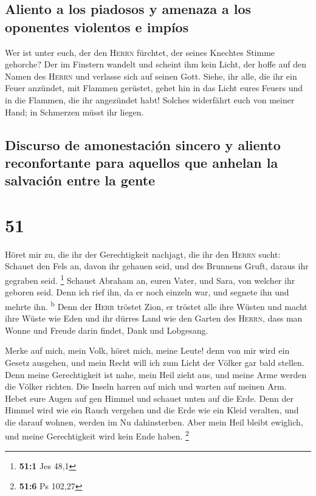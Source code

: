 \hypertarget{aliento-a-los-piadosos-y-amenaza-a-los-oponentes-violentos-e-impuxedos}{%
\subsection{Aliento a los piadosos y amenaza a los oponentes violentos e
impíos}\label{aliento-a-los-piadosos-y-amenaza-a-los-oponentes-violentos-e-impuxedos}}

 Wer ist unter euch, der den \textsc{Herrn} fürchtet, der
seines Knechtes Stimme gehorche? Der im Finstern wandelt und scheint ihm
kein Licht, der hoffe auf den Namen des \textsc{Herrn} und verlasse sich
auf seinen Gott.  Siehe, ihr alle, die ihr ein Feuer
anzündet, mit Flammen gerüstet, gehet hin in das Licht eures Feuers und
in die Flammen, die ihr angezündet habt! Solches widerfährt euch von
meiner Hand; in Schmerzen müsst ihr liegen.

\hypertarget{discurso-de-amonestaciuxf3n-sincero-y-aliento-reconfortante-para-aquellos-que-anhelan-la-salvaciuxf3n-entre-la-gente}{%
\subsection{Discurso de amonestación sincero y aliento reconfortante
para aquellos que anhelan la salvación entre la
gente}\label{discurso-de-amonestaciuxf3n-sincero-y-aliento-reconfortante-para-aquellos-que-anhelan-la-salvaciuxf3n-entre-la-gente}}

\hypertarget{section-50}{%
\section{51}\label{section-50}}

 Höret mir zu, die ihr der Gerechtigkeit nachjagt, die ihr
den \textsc{Herrn} sucht: Schauet den Fels an, davon ihr gehauen seid,
und des Brunnens Gruft, daraus ihr gegraben seid. \footnote{\textbf{51:1}
  Jes 48,1}  Schauet Abraham an, euren Vater, und Sara,
von welcher ihr geboren seid. Denn ich rief ihn, da er noch einzeln war,
und segnete ihn und mehrte ihn. \textsuperscript{b}  Denn
der \textsc{Herr} tröstet Zion, er tröstet alle ihre Wüsten und macht
ihre Wüste wie Eden und ihr dürres Land wie den Garten des
\textsc{Herrn}, dass man Wonne und Freude darin findet, Dank und
Lobgesang.

 Merke auf mich, mein Volk, höret mich, meine Leute! denn
von mir wird ein Gesetz ausgehen, und mein Recht will ich zum Licht der
Völker gar bald stellen.  Denn meine Gerechtigkeit ist
nahe, mein Heil zieht aus, und meine Arme werden die Völker richten. Die
Inseln harren auf mich und warten auf meinen Arm.  Hebet
eure Augen auf gen Himmel und schauet unten auf die Erde. Denn der
Himmel wird wie ein Rauch vergehen und die Erde wie ein Kleid veralten,
und die darauf wohnen, werden im Nu dahinsterben. Aber mein Heil bleibt
ewiglich, und meine Gerechtigkeit wird kein Ende haben. \footnote{\textbf{51:6}
  Ps 102,27}

